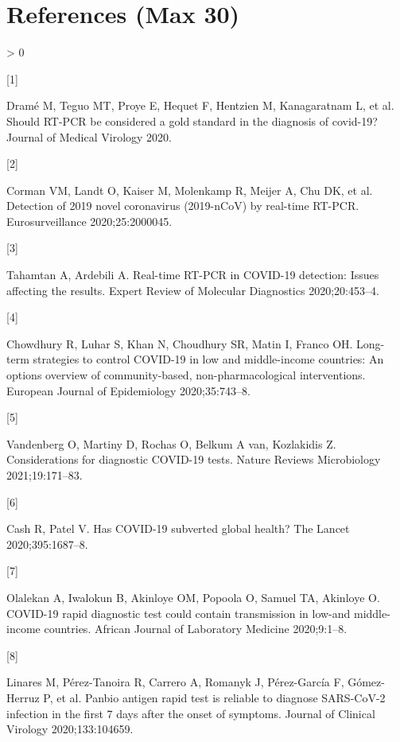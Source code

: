 \documentclass[]{elsarticle} %
\newlength{\cslhangindent}
\newlength{\csllabelwidth}
\newenvironment{CSLReferences}[2] %
 {%
  \setlength{\parindent}{0pt}
  \ifodd #1 \everypar{\setlength{\hangindent}{\cslhangindent}}\ignorespaces\fi
  \ifnum #2 > 0
  \setlength{\parskip}{#2\baselineskip}
  \fi
 }%
 {}
\newcommand{\CSLLeftMargin}[1]{\parbox[t]{\csllabelwidth}{#1}}
\newcommand{\CSLRightInline}[1]{\parbox[t]{\linewidth - \csllabelwidth}{#1}\break}
\begin{document}
\hypertarget{references-max-30}{%
\section*{References (Max 30)}\label{references-max-30}}

\hypertarget{refs}{}
\begin{CSLReferences}{0}{0}
\leavevmode\hypertarget{ref-drame2020should}{}%
\CSLLeftMargin{{[}1{]} }
\CSLRightInline{Dramé M, Teguo MT, Proye E, Hequet F, Hentzien M, Kanagaratnam L, et al. Should RT-PCR be considered a gold standard in the diagnosis of covid-19? Journal of Medical Virology 2020.}

\leavevmode\hypertarget{ref-corman2020detection}{}%
\CSLLeftMargin{{[}2{]} }
\CSLRightInline{Corman VM, Landt O, Kaiser M, Molenkamp R, Meijer A, Chu DK, et al. Detection of 2019 novel coronavirus (2019-nCoV) by real-time RT-PCR. Eurosurveillance 2020;25:2000045.}

\leavevmode\hypertarget{ref-tahamtan2020real}{}%
\CSLLeftMargin{{[}3{]} }
\CSLRightInline{Tahamtan A, Ardebili A. Real-time RT-PCR in COVID-19 detection: Issues affecting the results. Expert Review of Molecular Diagnostics 2020;20:453--4.}

\leavevmode\hypertarget{ref-chowdhury2020long}{}%
\CSLLeftMargin{{[}4{]} }
\CSLRightInline{Chowdhury R, Luhar S, Khan N, Choudhury SR, Matin I, Franco OH. Long-term strategies to control COVID-19 in low and middle-income countries: An options overview of community-based, non-pharmacological interventions. European Journal of Epidemiology 2020;35:743--8.}

\leavevmode\hypertarget{ref-vandenberg2021considerations}{}%
\CSLLeftMargin{{[}5{]} }
\CSLRightInline{Vandenberg O, Martiny D, Rochas O, Belkum A van, Kozlakidis Z. Considerations for diagnostic COVID-19 tests. Nature Reviews Microbiology 2021;19:171--83.}

\leavevmode\hypertarget{ref-cash2020has}{}%
\CSLLeftMargin{{[}6{]} }
\CSLRightInline{Cash R, Patel V. Has COVID-19 subverted global health? The Lancet 2020;395:1687--8.}

\leavevmode\hypertarget{ref-olalekan2020covid}{}%
\CSLLeftMargin{{[}7{]} }
\CSLRightInline{Olalekan A, Iwalokun B, Akinloye OM, Popoola O, Samuel TA, Akinloye O. COVID-19 rapid diagnostic test could contain transmission in low-and middle-income countries. African Journal of Laboratory Medicine 2020;9:1--8.}

\leavevmode\hypertarget{ref-linares2020panbio}{}%
\CSLLeftMargin{{[}8{]} }
\CSLRightInline{Linares M, Pérez-Tanoira R, Carrero A, Romanyk J, Pérez-García F, Gómez-Herruz P, et al. Panbio antigen rapid test is reliable to diagnose SARS-CoV-2 infection in the first 7 days after the onset of symptoms. Journal of Clinical Virology 2020;133:104659.}


\end{CSLReferences}
\end{document}
